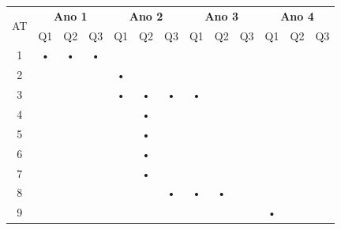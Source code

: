 \begin{table}[htbp]
	\centering
		\begin{tabular}{|c|c|c|c|c|c|c|c|c|c|c|c|c|}
		\hline
		\multirow{2}{*}{AT} & \multicolumn{3}{c|}{\textbf{Ano 1}} & \multicolumn{3}{c|}{\textbf{Ano 2}} & \multicolumn{3}{c|}{\textbf{Ano 3}} & \multicolumn{3}{c|}{\textbf{Ano 4}} \\ \cline{2-13} 
												& Q1         & Q2         & Q3        & Q1         & Q2         & Q3        & Q1         & Q2         & Q3        & Q1         & Q2         & Q3        \\ \hline
		1                   & •          & •          & •         &            &            &           &            &            &           &            &            &           \\ \hline
		2                   &            &            &           & •          &            &           &            &            &           &            &            &           \\ \hline
		3                   &            &            &           & •          & •          & •         & •          &            &           &            &            &           \\ \hline
		4                   &            &            &           &            & •          &           &            &            &           &            &            &           \\ \hline
		5                   &            &            &           &            & •          &           &            &            &           &            &            &           \\ \hline
		6                   &            &            &           &            & •          &           &            &            &           &            &            &           \\ \hline
		7                   &            &            &           &            & •          &           &            &            &           &            &            &           \\ \hline
		8                   &            &            &           &            &            & •         & •          & •          &           &            &            &           \\ \hline
		9                   &            &            &           &            &            &           &            &            &           & •          &            &           \\ \hline

\end{tabular}
\end{table}
